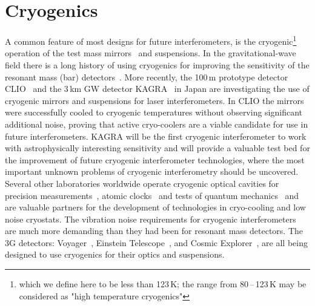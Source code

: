 \chapter{Cryogenics}
\label{sec:Cryogenics}
A common feature of most designs for future interferometers, is the cryogenic\footnote{which we define here to be less than 123\,K; the range from 80\,--\,123\,K may be considered as "high temperature cryogenics"} operation of the test mass mirrors~\cite{ET2011, ISWP:2018} and suspensions. In the gravitational-wave field there is a long history of using cryogenics for improving the sensitivity of the resonant mass (bar) detectors~\cite{ColdBars}. 
More recently, the 100\,m prototype detector CLIO~\cite{CLIO:2008} and the 3\,km GW detector KAGRA~\cite{KAGRA2013} in Japan are investigating the use of cryogenic mirrors and suspensions for laser interferometers.
In CLIO the mirrors were successfully cooled to cryogenic temperatures without observing significant additional noise, proving that active cryo-coolers are a viable candidate for use in future interferometers. KAGRA will be the first cryogenic interferometer to work with astrophysically interesting sensitivity and will provide a valuable test bed for the improvement of future cryogenic interferometer technologies, where the most important unknown problems of cryogenic interferometry should be uncovered. Several other laboratories worldwide operate cryogenic optical cavities for precision measurements~\cite{Holger:Munich}, atomic clocks~\cite{JunYegroup} and tests of quantum mechanics~\cite{CaltechIQIM} and are valuable partners for the development of technologies in cryo-cooling and low noise cryostats. The vibration noise requirements for cryogenic interferometers are much more demanding than they had been for resonant mass detectors.
The 3G detectors: Voyager~\cite{Voyager:Inst}, Einstein Telescope~\cite{Sathyaprakash:2012jt}, and Cosmic Explorer~\cite{CosmicExplorer2017}, are all being designed to use cryogenics for their optics and suspensions.

